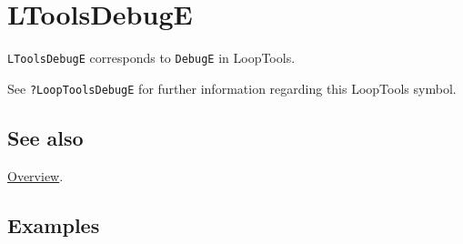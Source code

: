 \documentclass[../FeynHelpersManual.tex]{subfiles}
\begin{document}
\hypertarget{ltoolsdebuge}{
\section{LToolsDebugE}\label{ltoolsdebuge}}

\texttt{LToolsDebugE} corresponds to \texttt{DebugE} in LoopTools.

See \texttt{?LoopTools\textasciigrave DebugE} for further information
regarding this LoopTools symbol.

\subsection{See also}

\hyperlink{toc}{Overview}.

\subsection{Examples}
\end{document}

